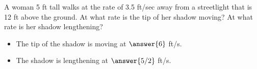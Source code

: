 \documentclass{ximera}
\author{Bart Snapp}
\begin{document}
\begin{exercise}

A woman 5 ft tall walks at the rate of 3.5 ft/sec away from a
streetlight that is 12 ft above the ground.  At what rate is the tip
of her shadow moving?  At what rate is her shadow lengthening?
\begin{prompt}
  \begin{itemize}
  \item The tip of the shadow is moving at $\answer{6}$ ft/s.
  \item The shadow is lengthening at $\answer{5/2}$ ft/s.
  \end{itemize}
\end{prompt}
\end{exercise}
\end{document}
